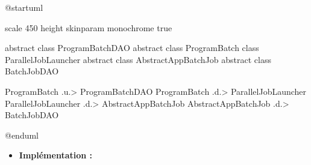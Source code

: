 \documentclass[a4paper, 12pt]{report}
\begin{document}
\begin{center}
  \begin{plantuml}
    @startuml

    scale 450 height
    skinparam monochrome true

    abstract class ProgramBatchDAO
    abstract class ProgramBatch
    class ParallelJobLauncher
    abstract class AbstractAppBatchJob
    abstract class BatchJobDAO

    ProgramBatch .u.> ProgramBatchDAO
    ProgramBatch .d.> ParallelJobLauncher
    ParallelJobLauncher .d.> AbstractAppBatchJob
    AbstractAppBatchJob .d.> BatchJobDAO

    @enduml
  \end{plantuml}
\end{center}
\clearpage

\begin{itemize}
  \item \textbf{Implémentation :}\\
\end{itemize}
\end{document}
